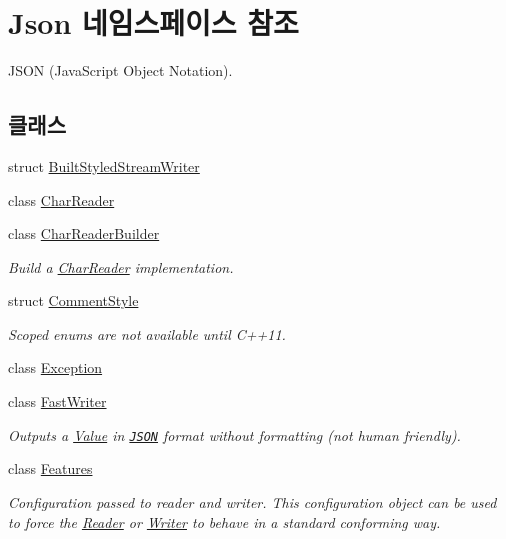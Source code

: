 \hypertarget{namespace_json}{}\section{Json 네임스페이스 참조}
\label{namespace_json}


J\+S\+ON (Java\+Script Object Notation).  


\subsection*{클래스}
\begin{DoxyCompactItemize}
\item 
struct \hyperlink{struct_json_1_1_built_styled_stream_writer}{Built\+Styled\+Stream\+Writer}
\item 
class \hyperlink{class_json_1_1_char_reader}{Char\+Reader}
\item 
class \hyperlink{class_json_1_1_char_reader_builder}{Char\+Reader\+Builder}
\begin{DoxyCompactList}\small\item\em Build a \hyperlink{class_json_1_1_char_reader}{Char\+Reader} implementation. \end{DoxyCompactList}\item 
struct \hyperlink{struct_json_1_1_comment_style}{Comment\+Style}
\begin{DoxyCompactList}\small\item\em Scoped enums are not available until C++11. \end{DoxyCompactList}\item 
class \hyperlink{class_json_1_1_exception}{Exception}
\item 
class \hyperlink{class_json_1_1_fast_writer}{Fast\+Writer}
\begin{DoxyCompactList}\small\item\em Outputs a \hyperlink{class_json_1_1_value}{Value} in \href{http://www.json.org}{\tt J\+S\+ON} format without formatting (not human friendly). \end{DoxyCompactList}\item 
class \hyperlink{class_json_1_1_features}{Features}
\begin{DoxyCompactList}\small\item\em Configuration passed to reader and writer. This configuration object can be used to force the \hyperlink{class_json_1_1_reader}{Reader} or \hyperlink{class_json_1_1_writer}{Writer} to behave in a standard conforming way. \end{DoxyCompactList}\item 

\end{DoxyCompactItemize}
